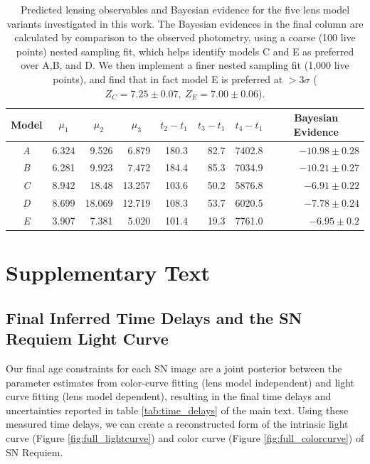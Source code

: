 \documentclass[12pt,dvipsnames]{article}
\def\SNABC{SN Requiem\xspace}
\begin{document}
\begin{table}[h]
\begin{tabular}{crrrrrrr}
    
    
    \multicolumn{1}{c}{Model} &\multicolumn{1}{c}{$\mu_1$} & \multicolumn{1}{c}{$\mu_2$} &\multicolumn{1}{c}{$\mu_3$} &\multicolumn{1}{c}{$t_2-t_1$} & \multicolumn{1}{c}{$t_3-t_1$}& \multicolumn{1}{c}{$t_4-t_1$} & \multicolumn{1}{c}{Bayesian Evidence}\\
\midrule
\textit{A} & 6.324 & 9.526 & 6.879 & 180.3 & 82.7&7402.8&$-10.98\pm0.28$ \\
\textit{B} & 6.281 & 9.923 & 7.472 & 184.4 & 85.3&7034.9&$-10.21\pm0.27$ \\
\textit{C} &8.942  & 18.48 & 13.257 & 103.6 & 50.2&5876.8&$-6.91\pm0.22$ \\
\textit{D} & 8.699 & 18.069 & 12.719 & 108.3 & 53.7&6020.5&$-7.78\pm0.24$ \\
\textit{E} & 3.907 & 7.381 & 5.020 & 101.4 & 19.3&7761.0&$-6.95\pm0.2$ \\
\end{tabular}
\caption{\label{tab:model_evidence}Predicted lensing observables and Bayesian evidence for the five lens model variants investigated in this work. The Bayesian evidences in the final column are calculated by comparison to the observed photometry, using a coarse (100 live points) nested sampling fit, which helps identify models C and E as preferred over A,B, and D. We then implement a finer nested sampling fit (1,000 live points), and find that in fact model E is preferred at $>3\sigma$ ($Z_C=7.25\pm0.07, \ Z_E=7.00\pm0.06$).}
\end{table}

\section*{Supplementary Text}

\subsection*{Final Inferred Time Delays and the \SNABC Light Curve}

Our final age constraints for each SN image are a joint posterior between the parameter estimates from color-curve fitting (lens model independent) and light curve fitting (lens model dependent), resulting in the final time delays and uncertainties reported in table \ref{tab:time_delays} of the main text. Using these measured time delays, we can create a reconstructed form of the intrinsic light curve (Figure \ref{fig:full_lightcurve}) and color curve (Figure \ref{fig:full_colorcurve}) of \SNABC.
\end{document}
